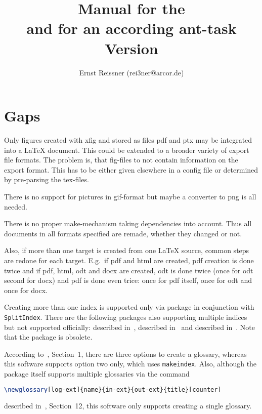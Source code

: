 \documentclass[12pt]{book}
\title{Manual for the \artifactId{} \protect\\
  and for an according ant-task \protect\\
Version \strippedVersionID}
\author{Ernst Reissner (rei3ner@arcor.de)}
\date{\versionDate}
\newcommand{\gls}[1]{#1}
\renewcommand{\lstlistoflistings}{\begingroup
\tocfile{\lstlistingname}{lol}
\endgroup}
\renewcommand{\lstlistoflistings}{\begingroup
\tocfile{List of \lstlistingname{}s}{lol}
\endgroup}
\begin{document}
\maketitle

\tableofcontents
\listoffigures
\listoftables
\lstlistoflistings%











\chapter{Gaps}\label{chap:gaps}

Only figures created with xfig and stored as files pdf and ptx 
may be integrated into a \LaTeX{} document. 
This could be extended to a broader variety of export file formats. 
The problem is, that fig-files to not contain information on the export
format. 
This has to be either given elsewhere in a config file 
or determined by pre-parsing the tex-files. 

There is no support for pictures in \gls{gif}-format 
but maybe a converter to \gls{png} is all needed. 

There is no proper make-mechanism taking dependencies into account. 
Thus all documents in all formats specified are remade, 
whether they changed or not. 

Also, if more than one target is created from one \LaTeX{} source, 
common steps are redone for each target. 
E.g.~if pdf and html are created, 
pdf creation is done twice and if pdf, html, odt and docx are created, 
odt is done twice (once for odt second for docx) 
and pdf is done even trice: 
once for pdf itself, once for odt and once for docx. 

Creating more than one index is supported only 
via package  in conjunction with \texttt{SplitIndex}. 
There are the following packages also supporting multiple indices 
but not supported officially: 
 described in~\cite{IndexP}, 
 described in~\cite{AmsmidxP} and 
 described in~\cite{ImakeidxP}.
Note that the package  is obsolete. 

According to~\cite{GloP}, Section~1, 
there are three options to create a glossary, 
whereas this software supports option two only, 
which uses \texttt{makeindex}. 
Also, although the package  itself 
supports multiple glossaries via the command
%
\begin{lstlisting}[language=TeX, basicstyle=\small]
\newglossary[log-ext]{name}{in-ext}{out-ext}{title}[counter]
\end{lstlisting}
%
described in~\cite{GloP}, Section~12, 
this software only supports creating a single glossary. 
\end{document}
